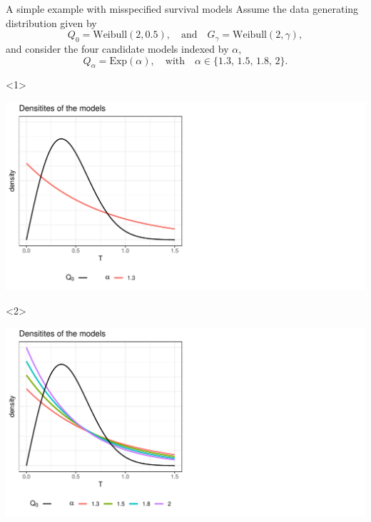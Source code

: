 \documentclass[smaller]{beamer}\usepackage{listings}
\begin{document}
\begin{frame}[label={sec:org0d529a0}]{A simple example with misspecified survival models}
\small Assume the data generating distribution given by
\begin{equation*}
  Q_0 = \text{Weibull}(2,  0.5),
  \quad \text{and} \quad
  G_{\gamma} = \text{Weibull}(2,\gamma),
\end{equation*}
and consider the four candidate models indexed by $\alpha$,
\begin{equation*}
  Q_{\alpha} = \text{Exp}(\alpha),
  \quad \text{with} \quad 
  \alpha \in \{1.3, \,1.5,\, 1.8,\, 2\}.
\end{equation*}

\vfill

\begin{onlyenv}<1>
\begin{center}
\includegraphics[width=.9\linewidth]{fig-mix-const-v1.pdf}
\end{center}
\end{onlyenv}

\begin{onlyenv}<2>
\begin{center}
\includegraphics[width=.9\linewidth]{fig-mix-const-v2.pdf}
\end{center}
\end{onlyenv}


\end{frame}
\end{document}
